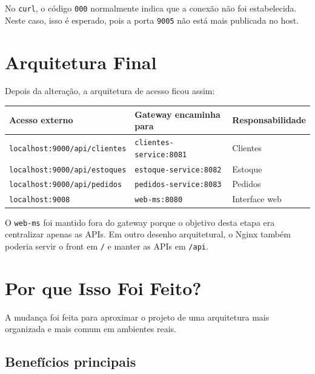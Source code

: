 \documentclass[12pt,a4paper]{article}
\begin{document}
\begin{infobox}
  No \texttt{curl}, o c\'odigo \texttt{000} normalmente indica que a conex\~ao n\~ao foi estabelecida. Neste caso, isso \'e esperado, pois a porta \texttt{9005} n\~ao est\'a mais publicada no host.
\end{infobox}

\section{Arquitetura Final}

Depois da altera\c{c}\~ao, a arquitetura de acesso ficou assim:

\begin{center}
\begin{tabular}{lll}
\toprule
\textbf{Acesso externo} & \textbf{Gateway encaminha para} & \textbf{Responsabilidade} \\
\midrule
\texttt{localhost:9000/api/clientes} & \texttt{clientes-service:8081} & Clientes \\
\texttt{localhost:9000/api/estoques} & \texttt{estoque-service:8082} & Estoque \\
\texttt{localhost:9000/api/pedidos} & \texttt{pedidos-service:8083} & Pedidos \\
\texttt{localhost:9008} & \texttt{web-ms:8080} & Interface web \\
\bottomrule
\end{tabular}
\end{center}

\begin{alertbox}
  O \texttt{web-ms} foi mantido fora do gateway porque o objetivo desta etapa era centralizar apenas as APIs. Em outro desenho arquitetural, o Nginx tamb\'em poderia servir o front em \texttt{/} e manter as APIs em \texttt{/api}.
\end{alertbox}

\section{Por que Isso Foi Feito?}

A mudan\c{c}a foi feita para aproximar o projeto de uma arquitetura mais organizada e mais comum em ambientes reais.

\subsection{Benef\'icios principais}
\end{document}
